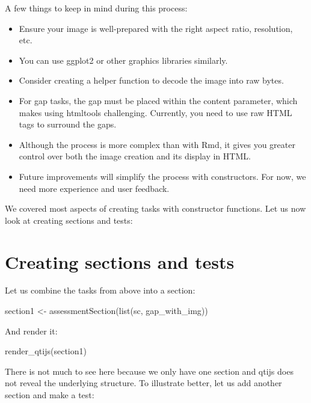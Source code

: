 \documentclass[twoside]{tufte-book}
\newenvironment{Shaded}{}{}
\newcommand{\FunctionTok}[1]{\textcolor[rgb]{0.02,0.16,0.49}{#1}}
\newcommand{\NormalTok}[1]{#1}
\newcommand{\OtherTok}[1]{\textcolor[rgb]{0.00,0.44,0.13}{#1}}
\providecommand{\tightlist}{%
  \setlength{\itemsep}{0pt}\setlength{\parskip}{0pt}}
\begin{document}
A few things to keep in mind during this process:

\begin{itemize}
\tightlist
\item
  Ensure your image is well-prepared with the right aspect ratio, resolution, etc.
\item
  You can use ggplot2 or other graphics libraries similarly.
\item
  Consider creating a helper function to decode the image into raw bytes.
\item
  For gap tasks, the gap must be placed within the content parameter, which makes using htmltools challenging. Currently, you need to use raw HTML tags to surround the gaps.
\item
  Although the process is more complex than with Rmd, it gives you greater control over both the image creation and its display in HTML.
\item
  Future improvements will simplify the process with constructors. For now, we need more experience and user feedback.
\end{itemize}

We covered most aspects of creating tasks with constructor functions. Let us now look at creating sections and tests:

\section{Creating sections and tests}\label{creating-sections-and-tests}

Let us combine the tasks from above into a section:

\begin{Shaded}
\begin{Highlighting}[]
\NormalTok{section1 }\OtherTok{\textless{}{-}} \FunctionTok{assessmentSection}\NormalTok{(}\FunctionTok{list}\NormalTok{(sc, gap\_with\_img))}
\end{Highlighting}
\end{Shaded}

And render it:

\begin{Shaded}
\begin{Highlighting}[]
\FunctionTok{render\_qtijs}\NormalTok{(section1)}
\end{Highlighting}
\end{Shaded}

There is not much to see here because we only have one section and qtijs does not reveal the underlying structure. To illustrate better, let us add another section and make a test:
\end{document}
